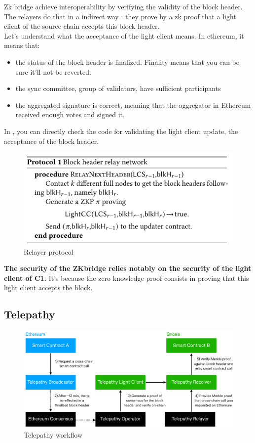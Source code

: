 Zk bridge achieve interoperability by verifying the validity of the block header. The relayers do that in a indirect way : they prove by a zk proof that a light client of the source chain accepts this block header. 
\\
Let's understand what the acceptance of the light client means. 
In ethereum, it means that: 
\begin{itemize}
    \item the status of the block header is finalized. Finality means that you can be sure it'll not be reverted. 
    \item the sync committee, group of validators, have sufficient participants 
    \item the aggregated signature is correct, meaning that the aggregator in Ethereum received enough votes and signed it.
\end{itemize}
In \cite{ethereumlcvalidation}, you can directly check the code for validating the light client update, the acceptance of the block header.  
\begin{figure}[H]
    \centering
    \includegraphics[width=0.6\linewidth]{interoperability/zkbridgeprotocol.png}
    \caption{Relayer protocol}
    \label{fig:zkbrigdeprotocol}
\end{figure}

\textbf{The security of the ZKbridge relies notably on the security of the light client of C1.} It's because the zero knowledge proof consists in proving that this light client accepts the block.

\subsection{Telepathy \cite{telepathy}}

\begin{figure}[H]
    \centering
    \includegraphics[width=0.8\linewidth]{interoperability/telepathy.png}
    \caption{Telepathy workflow}
    \label{fig:telepathy}
\end{figure}

